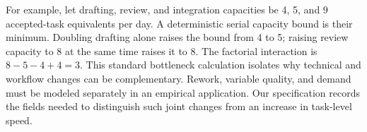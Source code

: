 For example, let drafting, review, and integration capacities be 4, 5, and 9 accepted-task equivalents per day. A deterministic serial capacity bound is their minimum. Doubling drafting alone raises the bound from 4 to 5; raising review capacity to 8 at the same time raises it to 8. The factorial interaction is $8-5-4+4=3$. This standard bottleneck calculation \citep{amdahl,little} isolates why technical and workflow changes can be complementary. Rework, variable quality, and demand must be modeled separately in an empirical application. Our specification records the fields needed to distinguish such joint changes from an increase in task-level speed.

